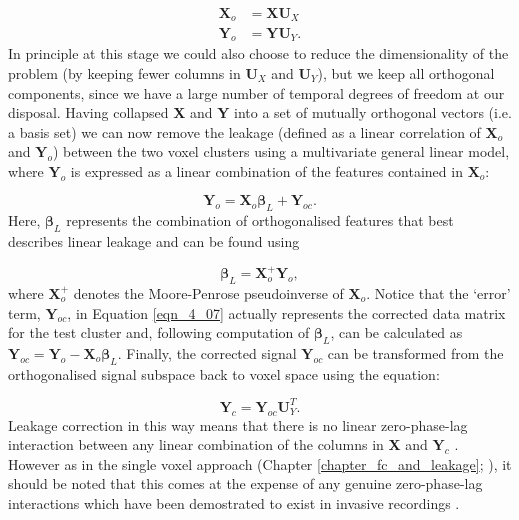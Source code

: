 \begin{align}
\mathbf{X}_o &= \mathbf{X}\mathbf{U}_X\\
\mathbf{Y}_o &= \mathbf{Y}\mathbf{U}_Y.
\end{align} In principle at this stage we could also choose to reduce the dimensionality of the problem (by keeping fewer columns in $\mathbf{U}_X$ and $\mathbf{U}_Y$), but we keep all orthogonal components, since we have a large number of temporal degrees of freedom at our disposal.  Having collapsed \textbf{X} and \textbf{Y} into a set of mutually orthogonal vectors (i.e. a basis set) we can now remove the leakage (defined as a linear correlation of $\mathbf{X}_o$ and $\mathbf{Y}_o$) between the two voxel clusters using a multivariate general linear model, where $\mathbf{Y}_o$ is expressed as a linear combination of the features contained in $\mathbf{X}_o$:

\begin{equation}\label{eqn_4_07}
\mathbf{Y}_o = \mathbf{X}_o\mathbf{\beta}_L+\mathbf{Y}_{oc}.
\end{equation} Here, $\mathbf{\beta}_L$ represents the combination of orthogonalised features that best describes linear leakage and can be found using

\begin{equation}
\mathbf{\beta}_L = \mathbf{X}_o^+\mathbf{Y}_o,
\end{equation} where $\mathbf{X}_o^+$ denotes the Moore-Penrose pseudoinverse of $\mathbf{X}_o$. Notice that the ‘error’ term, $\mathbf{Y}_{oc}$, in Equation \ref{eqn_4_07} actually represents the corrected data matrix for the test cluster and, following computation of $\mathbf{\beta}_L$, can be calculated as  $\mathbf{Y}_{oc} = \mathbf{Y}_{o} - \mathbf{X}_o\mathbf{\beta}_L$. Finally, the corrected signal $\mathbf{Y}_{oc}$ can be transformed from the orthogonalised signal subspace back to voxel space using the equation:

\begin{equation}
\mathbf{Y}_c = \mathbf{Y}_{oc}\mathbf{U}_Y^T.
\end{equation} Leakage correction in this way means that there is no linear zero-phase-lag interaction between any linear combination of the columns in \textbf{X} and $\mathbf{Y}_c$ . However as in the single voxel approach (Chapter \ref{chapter_fc_and_leakage}; \citealp{Brookes2012b,Hipp2012}), it should be noted that this comes at the expense of any genuine zero-phase-lag interactions which have been demostrated to exist in invasive recordings \citep{Singer1999,Leopold2003}.

